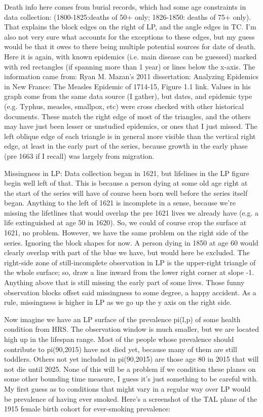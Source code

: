 Death info here comes from burial records, which had some age constraints in
data collection: (1800-1825:deaths of 50+ only; 1826-1850: deaths of 75+ only).
That explains the block edges on the right of LP, and the angle edges in TC. I'm also not very sure what accounts for the exceptions to these edges, but my guess would be that it owes to there being multiple potential sources for date of death.
Here it is again, with known epidemics (i.e. main disease can be guessed) marked
with red rectangles (if spanning more than 1 year) or lines below the x-axis.
The information came from: Ryan M. Mazan's 2011 dissertation: Analyzing Epidemics in New France: The Measles Epidemic of 1714-15, Figure 1.1 link. Values in his graph come from the same data source (I gather), but dates, and epidemic type (e.g. Typhus, measles, smallpox, etc) were cross checked with other historical documents. These match the right edge of most of the triangles, and the others may have just been lesser or unstudied epidemics, or ones that I just missed. The left oblique edge of each triangle is in general more visible than the vertical right edge, at least in the early part of the series, because growth in the early phase (pre 1663 if I recall) was largely from migration.

Missingness in LP:
Data collection began in 1621, but lifelines in the LP figure begin well left of that. This is because a person dying at some old age right at the start of the series will have of course been born well before the series itself began. Anything to the left of 1621 is incomplete in a sense, because we're missing the lifetlines that would overlap the pre 1621 lives we already have (e.g. a life extinguished at age 50 in 1620). So, we could of course crop the surface at 1621, no problem. However, we have the same problem on the right side of the series. Ignoring the block shapes for now.  A person dying in 1850 at age 60 would clearly overlap with part of the blue we have, but would here be excluded. The right-side zone of still-incomplete observation in LP is the upper-right triangle of the whole surface; so, draw a line inward from the lower right corner at slope -1. Anything above that is still missing the early part of some lives. Those funny observation blocks offset said missingness to some degree, a happy accident. As a rule, missingness is higher in LP as we go up the y axis on the right side.

Now imagine we have an LP surface of the prevalence pi(l,p) of some health condition from HRS. The observation window is much smaller, but we are located high up in the lifespan range. Most of the people whose prevalence should contribute to  pi(90,2015) have not died yet, because many of them are still toddlers. Others not yet included in  pi(90,2015) are those age 80 in 2015 that will not die until 2025. None of this will be a problem if we condition these planes on some other bounding time measure, I guess it's just something to be careful with. My first guess as to conditions that might vary in a regular way over LP would be prevalence of having ever smoked. Here's a screenshot of the TAL plane of the 1915 female birth cohort for ever-smoking prevalence:

